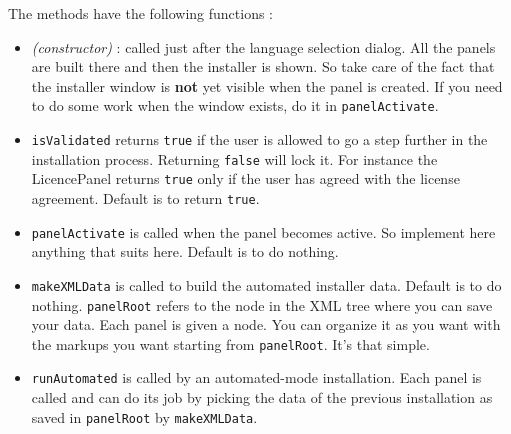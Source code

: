 The methods have the following functions :\\
\begin{itemize}

  \item \textit{(constructor)} : called just after the language selection
  dialog. All the panels are built there and then the installer is shown. So
  take care of the fact that the installer window is \textbf{not} yet visible
  when the panel is created. If you need to do some work when the window exists,
  do it in \texttt{panelActivate}.\\

  \item \texttt{isValidated} returns \texttt{true} if the user is allowed to
  go a step further in the installation process. Returning \texttt{false} will
  lock it. For instance the LicencePanel returns \texttt{true} only if the user
  has agreed with the license agreement. Default is to return \texttt{true}.\\
  
  \item \texttt{panelActivate} is called when the panel becomes active. So
  implement here anything that suits here. Default is to do nothing.\\
  
  \item \texttt{makeXMLData} is called to build the automated installer data.
  Default is to do nothing. \texttt{panelRoot} refers to the node in the XML
  tree where you can save your data. Each panel is given a node. You can
  organize it as you want with the markups you want starting from
  \texttt{panelRoot}. It's that simple.\\
  
  \item \texttt{runAutomated} is called by an automated-mode installation. Each
  panel is called and can do its job by picking the data of the previous
  installation as saved in \texttt{panelRoot} by \texttt{makeXMLData}.\\

\end{itemize}\
